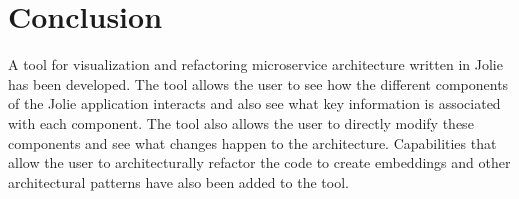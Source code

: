 \chapter{Conclusion}
A tool for visualization and refactoring microservice architecture written in Jolie has been developed.
The tool allows the user to see how the different components of the Jolie application interacts and also see what key information is associated with each component.
The tool also allows the user to directly modify these components and see what changes happen to the architecture.
Capabilities that allow the user to architecturally refactor the code to create embeddings and other architectural patterns have also been added to the tool.